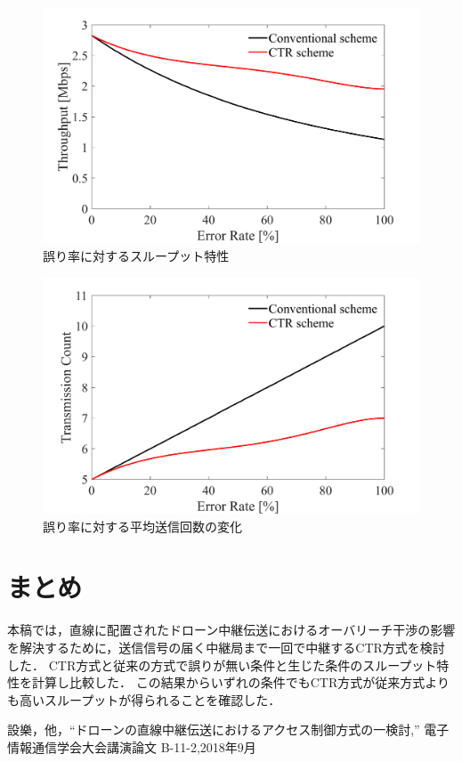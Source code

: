 \documentclass[a4paper,10pt]{ltjsarticle}
\begin{document}
\begin{figure}[H]
  \centering
  \includegraphics[width=\linewidth]{throughput_probabilistic_retry_v3.pdf} 
  \caption{誤り率に対するスループット特性}

\end{figure}
\begin{figure}[H]
  \centering
  \includegraphics[width=\linewidth]{throughput_probabilistic_retry_v3.1.pdf} 
  \caption{誤り率に対する平均送信回数の変化}

\end{figure}

\section{まとめ}
本稿では，直線に配置されたドローン中継伝送におけるオーバリーチ干渉の影響を解決するために，送信信号の届く中継局まで一回で中継するCTR方式を検討した．
CTR方式と従来の方式で誤りが無い条件と生じた条件のスループット特性を計算し比較した．
この結果からいずれの条件でもCTR方式が従来方式よりも高いスループットが得られることを確認した．

\begin{thebibliography}{99}
  設樂，他，“ドローンの直線中継伝送におけるアクセス制御方式の一検討,” 電子情報通信学会大会講演論文 B-11-2,2018年9月
\end{thebibliography}

%
\end{document}
